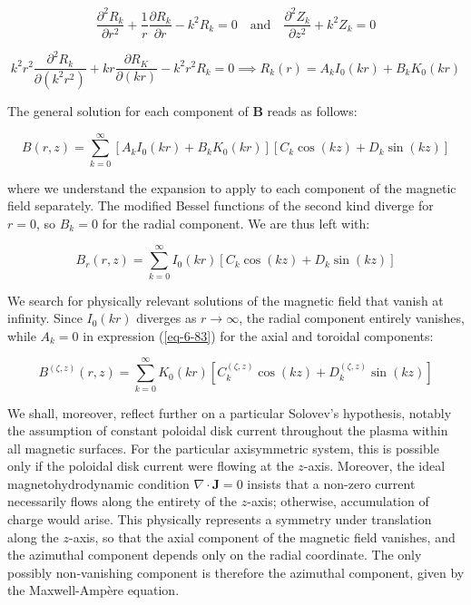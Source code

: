 \begin{equation}
    \frac{\partial^2R_k}{\partial r^2}+\frac{1}{r}\frac{\partial R_k}{\partial r}-k^2R_k=0\quad\text{and}\quad\frac{\partial^2Z_k}{\partial z^2}+k^2Z_k=0
\end{equation}

\begin{equation}
    k^2r^2\frac{\partial^2R_k}{\partial(k^2r^2)}+kr\frac{\partial R_K}{\partial(kr)}-k^2r^2R_k=0\implies R_k(r)=A_kI_0(kr)+B_kK_0(kr)
\end{equation}

The general solution for each component of $\mathbf{B}$ reads as follows:

\begin{equation}
    \label{eq-6-83}
    B(r,z)=\sum_{k=0}^\infty\left[A_kI_0(kr)+B_kK_0(kr)\right]\left[C_k\cos{(kz)}+D_k\sin{(kz)}\right]
\end{equation}

where we understand the expansion to apply to each component of the magnetic field separately. The modified Bessel functions of the second kind diverge for $r=0$, so $B_k=0$ for the radial component. We are thus left with:

\begin{equation}
    B_r(r,z)=\sum_{k=0}^\infty I_0(kr)\left[C_k\cos{(kz)}+D_k\sin{(kz)}\right]
\end{equation}

We search for physically relevant solutions of the magnetic field that vanish at infinity. Since $I_0(kr)$ diverges as $r\to\infty$, the radial component entirely vanishes, while $A_k=0$ in expression (\ref{eq-6-83}) for the axial and toroidal components:

\begin{equation}
    B^{(\zeta,z)}(r,z)=\sum_{k=0}^\infty K_0(kr)\left[C_k^{(\zeta,z)}\cos{(kz)}+D_k^{(\zeta,z)}\sin{(kz)}\right]
\end{equation}

\quad We shall, moreover, reflect further on a particular Solovev's hypothesis, notably the assumption of constant poloidal disk current throughout the plasma within all magnetic surfaces. For the particular axisymmetric system, this is possible only if the poloidal disk current were flowing at the $z$-axis. Moreover, the ideal magnetohydrodynamic condition $\nabla\cdot\mathbf{J}=0$ insists that a non-zero current necessarily flows along the entirety of the $z$-axis; otherwise, accumulation of charge would arise. This physically represents a symmetry under translation along the $z$-axis, so that the axial component of the magnetic field vanishes, and the azimuthal component depends only on the radial coordinate. The only possibly non-vanishing component is therefore the azimuthal component, given by the Maxwell-Ampère equation.

